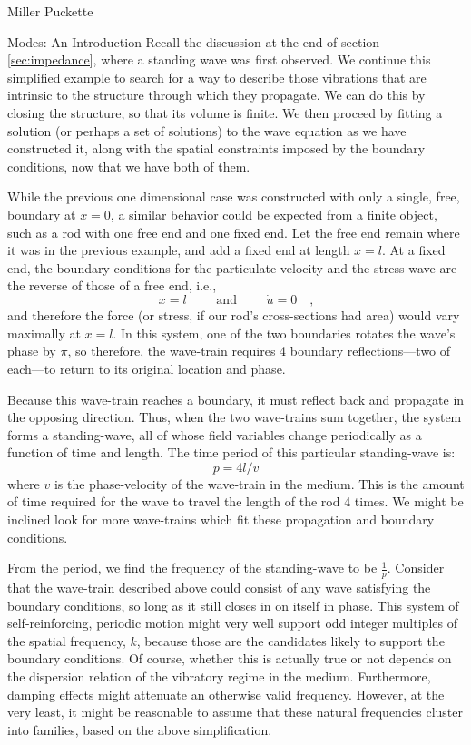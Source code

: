 \documentclass[a4paper,10pt]{report}
\numberwithin{equation}{section}
\begin{document}
\begin{chapter}{Miller Puckette}
\begin{section}{Modes: An Introduction}
Recall the discussion at the end of section \ref{sec:impedance}, where a standing wave was first observed. We continue this simplified example to search for a way to describe those vibrations that are intrinsic to the structure through which they propagate. We can do this by closing the structure, so that its volume is finite. We then proceed by fitting a solution (or perhaps a set of solutions) to the wave equation as we have constructed it, along with the spatial constraints imposed by the boundary conditions, now that we have both of them. 

While the previous one dimensional case was constructed with only a single, free, boundary at $x=0$, a similar behavior could be expected from a finite object, such as a rod with one free end and one fixed end. Let the free end remain where it was in the previous example, and add a fixed end at length $x=l$. At a fixed end, the boundary conditions for the particulate velocity and the stress wave are the reverse of those of a free end, i.e., 
\begin{equation*}
x=l \qquad \text{ and } \qquad \dot{u} = 0 \quad \text{,}
\end{equation*}
and therefore the force (or stress, if our rod's cross-sections had area) would vary maximally at $x=l$. In this system, one of the two boundaries rotates the wave's phase by $\pi$, so therefore, the wave-train requires 4 boundary reflections---two of each---to return to its original location and phase.

Because this wave-train reaches a boundary, it must reflect back and propagate in the opposing direction. Thus, when the two wave-trains sum together, the system forms a standing-wave, all of whose field variables change periodically as a function of time and length.\cite[p.~117]{Cremer1973} The time period of this particular standing-wave is:
\begin{equation}\label{0thmode}
p = 4l / v
\end{equation}
where $v$ is the phase-velocity of the wave-train in the medium. This is the amount of time required for the wave to travel the length of the rod 4 times. We might be inclined look for more wave-trains which fit these propagation and boundary conditions.\cite[p.117]{Cremer1973} 

From the period, we find the frequency of the standing-wave to be $\frac{1}{p}$. Consider that the wave-train described above could consist of any wave satisfying the boundary conditions, so long as it still closes in on itself in phase. This system of self-reinforcing, periodic motion might very well support odd integer multiples of the spatial frequency, $k$, because those are the candidates likely to support the boundary conditions. Of course, whether this is actually true or not depends on the dispersion relation of the vibratory regime in the medium. Furthermore, damping effects might attenuate an otherwise valid frequency. However, at the very least, it might be reasonable to assume that these natural frequencies cluster into families, based on the above simplification.\cite[p.~126]{Cremer1973}


\end{section}
\end{chapter}
\end{document}
